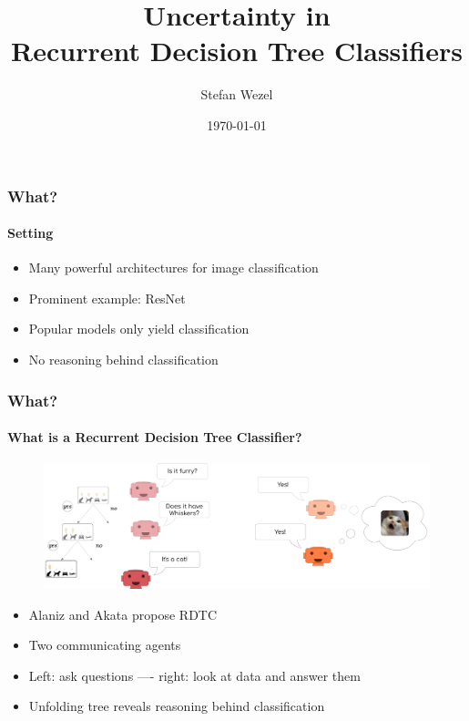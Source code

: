 \documentclass[9pt]{beamer}
\title{Uncertainty in\\Recurrent Decision Tree Classifiers}
\author{Stefan Wezel}
\institute{Explainable Machine Learning}
\date{\today}
\begin{document}
	

\begin{frame}[plain]
	\titlepage
\end{frame} 

\begin{frame}
\frametitle{What?}
\framesubtitle{Setting}
	\begin{itemize}%
	\item Many powerful architectures for image classification
	\item Prominent example: ResNet
	\item Popular models only yield classification
	\item No reasoning behind classification
	\end{itemize}
\end{frame} 


\begin{frame}
\frametitle{What?}
\framesubtitle{What is a Recurrent Decision Tree Classifier?}
	\begin{figure}
	\centering
	\includegraphics[width=1\textwidth]{images/rdtc_intuition.pdf}
\end{figure}
\begin{itemize}%
	\item Alaniz and Akata \cite{alaniz2019explainable} propose RDTC
	\item Two communicating agents
	\item Left: ask questions ---- right: look at data and answer them
	\item Unfolding tree reveals reasoning behind classification
\end{itemize}
\end{frame} 
\end{document}

